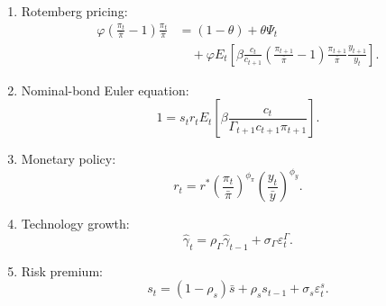 \documentclass[12pt,final]{article}
\begin{document}
\begin{enumerate}[label=\arabic*.,leftmargin=2.4em]
  \item Rotemberg pricing:
        \begin{align*}
          \varphi\left(\frac{\pi_t}{\bar\pi}-1\right)
          \frac{\pi_t}{\bar\pi}
           & =(1-\theta)+\theta\Psi_t \\
           & \quad+\varphi E_t\left[
            \beta\frac{c_t}{c_{t+1}}
            \left(\frac{\pi_{t+1}}{\bar\pi}-1\right)
            \frac{\pi_{t+1}}{\bar\pi}
            \frac{y_{t+1}}{y_t}
            \right].
        \end{align*}

  \item Nominal-bond Euler equation:
        \begin{equation*}
          1=s_tr_tE_t\left[
          \beta\frac{c_t}
          {\Gamma_{t+1}c_{t+1}\pi_{t+1}}
          \right].
        \end{equation*}

  \item Monetary policy:
        \begin{equation*}
          r_t=r^*
          \left(\frac{\pi_t}{\bar\pi}\right)^{\phi_\pi}
          \left(\frac{y_t}{\bar y}\right)^{\phi_y}.
        \end{equation*}

  \item Technology growth:
        \begin{equation*}
          \widehat\gamma_t
          =\rho_\Gamma\widehat\gamma_{t-1}
          +\sigma_\Gamma\varepsilon_t^\Gamma.
        \end{equation*}

  \item Risk premium:
        \begin{equation*}
          s_t=(1-\rho_s)\bar s+\rho_s s_{t-1}
          +\sigma_s\varepsilon_t^s.
        \end{equation*}
\end{enumerate}
\end{document}
